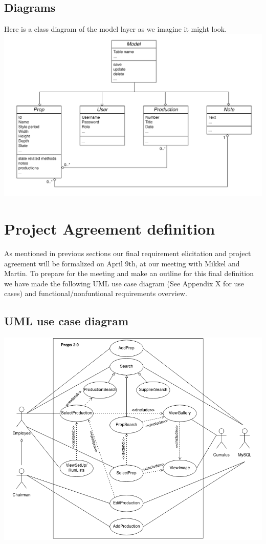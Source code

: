 \documentclass[12pt]{article}
\begin{document}
\subsection{Diagrams}
Here is a class diagram of the model layer as we imagine it might look.
\newline
\newline
\includegraphics[scale=0.2]{class-diagram.png}

\section{Project Agreement definition}
As mentioned in previous sections our final requirement elicitation and project agreement will be formalized on April 9th, at our meeting with Mikkel and Martin. To prepare for the meeting and make an outline for this final definition we have made the following UML use case diagram (See Appendix X for use cases) and functional/nonfuntional requirements overview.
\subsection{UML use case diagram}
\includegraphics[scale=0.6]{use.png}
\end{document}
